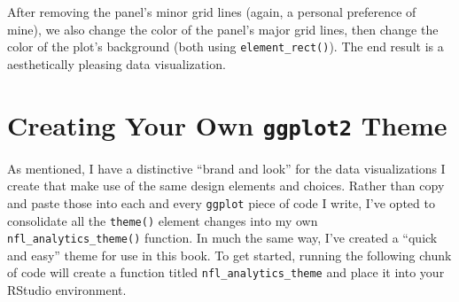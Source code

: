 \documentclass[
  letterpaper,
]{krantz}
\begin{document}
After removing the panel's minor grid lines (again, a personal
preference of mine), we also change the color of the panel's major grid
lines, then change the color of the plot's background (both using
\texttt{element\_rect()}). The end result is a aesthetically pleasing
data visualization.

\hypertarget{creating-your-own-ggplot2-theme}{%
\section{\texorpdfstring{Creating Your Own \texttt{ggplot2}
Theme}{Creating Your Own ggplot2 Theme}}\label{creating-your-own-ggplot2-theme}}

As mentioned, I have a distinctive ``brand and look'' for the data
visualizations I create that make use of the same design elements and
choices. Rather than copy and paste those into each and every
\texttt{ggplot} piece of code I write, I've opted to consolidate all the
\texttt{theme()} element changes into my own
\texttt{nfl\_analytics\_theme()} function. In much the same way, I've
created a ``quick and easy'' theme for use in this book. To get started,
running the following chunk of code will create a function titled
\texttt{nfl\_analytics\_theme} and place it into your RStudio
environment.
\end{document}
